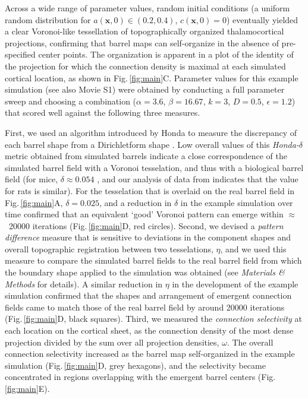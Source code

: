 \documentclass[9pt,lineno]{elife}
\newcommand{\cmnt}[1]{\textcolor{colcmnt}{#1}}
\newcommand{\metrics}[1]{\textcolor{colmetrics}{#1}}
\newcommand{\mb}[1]{\mathbf{#1}}
\begin{document}
\cmnt{Across a wide range of parameter values, random initial conditions (a
  uniform random distribution for $a(\mb{x},0)\in(0.2,0.4)$, $c(\mb{x},0)=0$)
  eventually yielded a clear Voronoi-like tessellation of topographically
  organized thalamocortical projections, confirming that barrel maps can
  self-organize in the absence of pre-specified center points. The
  organization is apparent in a plot of the identity of the projection for
  which the connection density is maximal at each simulated cortical location,
  as shown in Fig.\,\ref{fig:main}C. Parameter values for this example simulation
  (see also Movie S1) were obtained by
  conducting a full parameter sweep and choosing a combination
  ($\alpha=3.6$, $\beta=16.67$, $k=3$, $D=0.5$, $\epsilon=1.2$) that scored
  well against the following three measures.}

\metrics{First, we used an algorithm introduced by Honda to measure the
  discrepancy of each barrel shape from a Dirichletform shape}
\citep{honda_geometrical_1983}.  \metrics{Low overall values of this
  \emph{Honda-}$\delta$ metric obtained from simulated barrels indicate a
  close correspondence of the simulated barrel field with a Voronoi
  tesselation, and thus with a biological barrel field
  (for mice, $\delta\approx0.054$} \citealp{senft_mouse_1991}\metrics{, and
  our analysis of data from} \citealp{zheng_signal_2001} \metrics{ indicates that
  the value for rats is similar). For the tesselation
  that is overlaid on the real barrel field in Fig.\,\ref{fig:main}A,
  $\delta=0.025$, and a reduction in $\delta$ in the example simulation over
  time confirmed that an equivalent `good' Voronoi pattern can emerge
  within $\approx$~20000
  iterations (Fig.\,\ref{fig:main}D, red circles). Second, we devised a
  \emph{pattern difference} measure that is sensitive to deviations in the
  component shapes and overall topographic registration between two
  tesselations, $\eta$, and we used this measure to compare the simulated
  barrel fields to the real barrel field from which the boundary shape applied
  to the simulation was obtained (see \emph{Materials \& Methods} for
  details). A similar reduction in $\eta$ in the development of the example
  simulation confirmed that the shapes and arrangement of emergent connection
  fields came to match those of the real barrel field by around 20000
  iterations (Fig.\,\ref{fig:main}D, black squares). Third, we measured the
  \emph{connection selectivity} at each location on the cortical sheet, as the
  connection density of the most dense projection divided by the sum over all
  projection densities, $\omega$. The overall connection selectivity increased as the
  barrel map self-organized in the example simulation (Fig.\,\ref{fig:main}D,
  grey hexagons), and the selectivity became concentrated in regions
  overlapping with the emergent barrel centers (Fig.\,\ref{fig:main}E).}
\end{document}

